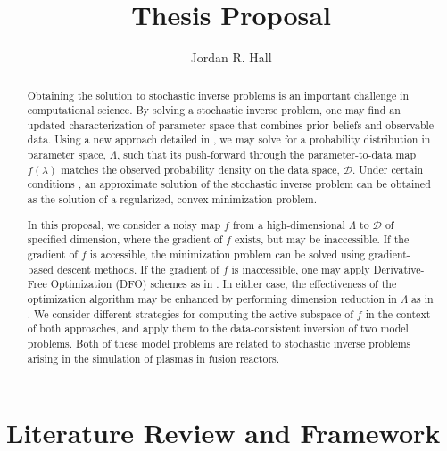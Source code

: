 \documentclass{amsart}
\begin{document}
\begin{abstract}

Obtaining the solution to stochastic inverse problems is an important challenge in computational science. By solving a stochastic inverse problem, one may find an updated  characterization of parameter space that combines  prior beliefs and observable data. Using a new approach detailed in \cite{BJW18a}, we may solve for a probability distribution in parameter space, $\Lambda$, such that its push-forward %
through the parameter-to-data map $f(\lambda)$ matches the observed probability density on the data space, $\mathcal{D}$. 
Under certain conditions \cite{BJW18a, Tarantola}, 
an approximate solution of the stochastic inverse problem can be obtained as the solution of a regularized, convex minimization problem.
  
In this proposal, we consider a noisy map $f$ from a high-dimensional $\Lambda$ to $\mathcal{D}$ of specified dimension, where the gradient of $f$ exists, but may be inaccessible. If the gradient of $f$ is accessible, the minimization problem can be solved using gradient-based descent methods. If the gradient of $f$ is inaccessible, one may apply Derivative-Free Optimization (DFO) schemes as in \cite{CW}. In either case,  the effectiveness of the optimization algorithm may be enhanced by performing dimension reduction in $\Lambda$ as in \cite{Constantine2015, Russi}. 
We consider different strategies for computing the active subspace of $f$ in the context of both approaches, and apply them to the data-consistent inversion of two model problems. Both of these model problems are related to stochastic inverse problems 
arising in the simulation of plasmas in fusion reactors.
 

\end{abstract}


\title{Thesis Proposal}

\author{Jordan R. Hall}

\maketitle



\tableofcontents

\setcounter{tocdepth}{0}




\newpage

\section{Literature Review and Framework}
\end{document}
